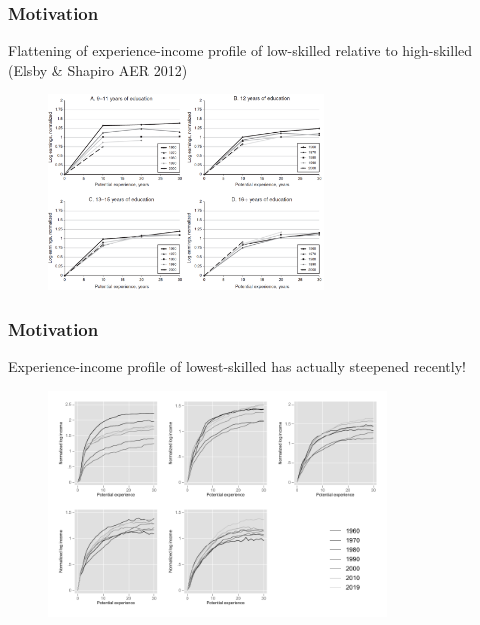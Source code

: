 \documentclass[aspectratio=169]{beamer}
\begin{document}
\begin{frame}
    \frametitle{Motivation}

    Flattening of experience-income profile of low-skilled relative to high-skilled (Elsby \& Shapiro AER 2012)
    \begin{figure}[t]
        \includegraphics[width=0.65\textwidth]{../output/profile_cohort_elsby_shapiro.png}
        \centering
    \end{figure}

\end{frame}

\begin{frame}
    \frametitle{Motivation}

    Experience-income profile of lowest-skilled has actually steepened recently!
    \begin{figure}[t]
        \includegraphics[width=0.8\textwidth]{../output/exp_wage_profile_cross.pdf}
        \centering
    \end{figure}
\end{frame}
\end{document}
